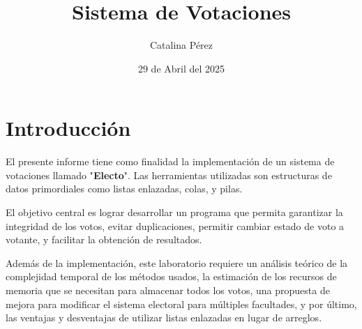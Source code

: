 \documentclass[12pt]{article}
\title{Sistema de Votaciones}					%
\author{Catalina Pérez \linebreak
\linebreak
\newline
\bttext{Profesor: \linebreak Marcos Fantoval}}
\date{29 de Abril del 2025}%
\makeatletter
\let\thetitle\@title
\let\theauthor\@author
\let\thedate\@date
\makeatother
\begin{document}

\pagebreak
\tableofcontents
\pagebreak

\section{Introducción}

El presente informe tiene como finalidad la implementación de un sistema de votaciones llamado "\textbf{Electo}". Las herramientas utilizadas son estructuras de datos primordiales como listas enlazadas, colas, y pilas. 

El objetivo central es lograr desarrollar un programa que permita garantizar la integridad de los votos, evitar duplicaciones, permitir cambiar estado de voto a votante, y facilitar la obtención de resultados.

Además de la implementación, este laboratorio requiere un análisis teórico de la complejidad temporal de los métodos usados, la estimación de los recursos de memoria que se necesitan para almacenar todos los votos, una propuesta de mejora para modificar el sistema electoral para múltiples facultades, y por último, las ventajas y desventajas de utilizar listas enlazadas en lugar de arreglos.
\end{document}
